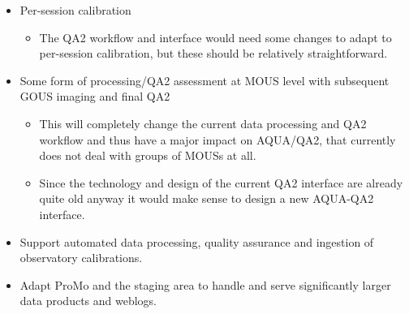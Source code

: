 \begin{itemize}[itemsep=-0.5em]

    \item Per-session calibration

    \begin{itemize}[itemsep=-0.5em]
        \item The QA2 workflow and interface would need some changes to adapt to per-session calibration, but these should be relatively straightforward.
    \end{itemize}

    \item Some form of processing/QA2 assessment at MOUS level with subsequent GOUS imaging and final QA2

    \begin{itemize}[itemsep=-0.5em]
        \item This will completely change the current data processing and QA2 workflow and thus have a major impact on AQUA/QA2, that currently does not deal with groups of MOUSs at all.
        \item Since the technology and design of the current QA2 interface are already quite old anyway it would make sense to design a new AQUA-QA2 interface.
    \end{itemize}

    \item Support automated data processing, quality assurance and ingestion of observatory calibrations.
    \item Adapt ProMo and the staging area to handle and serve significantly larger data products and weblogs.

\end{itemize}

